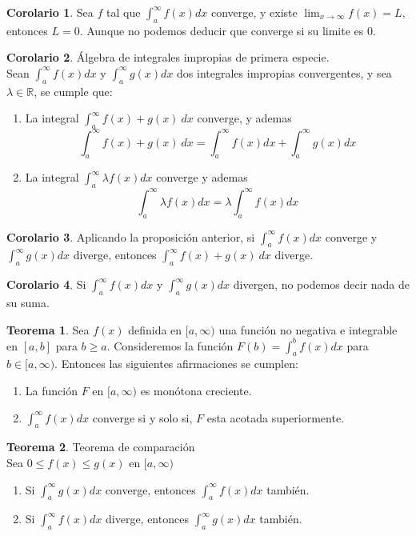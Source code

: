 \documentclass[10pt]{article}
\theoremstyle{definition}
\newtheorem{theorem}{Teorema}[section]
\newtheorem{corollary}{Corolario}[theorem]
\begin{document}
\begin{corollary}
    Sea $f$ tal que $\int_{a}^{\infty} f(x) dx$ converge, y existe $\lim_{x \to \infty} f(x)=L$, entonces $L=0$. Aunque no podemos deducir que converge si su limite es $0$.
\end{corollary}
\begin{corollary}{Álgebra de integrales impropias de primera especie.}
	\\Sean $\int_{a}^{\infty} f(x) dx$ y $\int_{a}^{\infty} g(x) dx$ dos integrales impropias convergentes, y sea $\lambda\in\mathbb{R}$, se cumple que:
	\begin{enumerate}
		\item La integral $\int_{a}^{\infty} f(x)+ g(x)\ dx$ converge, y ademas $$\int_{a}^{\infty} f(x)+g(x)\ dx=\int_{a}^{\infty} f(x) dx+\int_{a}^{\infty} g(x) dx$$
		\item La integral $\int_{a}^{\infty} \lambda f(x) dx$ converge y ademas $$\int_{a}^{\infty} \lambda f(x) dx=\lambda \int_{a}^{\infty} f(x) dx$$
	\end{enumerate}
\end{corollary}
\begin{corollary}
	Aplicando la proposición anterior, si $\int_{a}^{\infty} f(x) dx$ converge y $\int_{a}^{\infty} g(x) dx$ diverge, entonces $\int_{a}^{\infty} f(x)+g(x)\ dx$ diverge.
\end{corollary}
\begin{corollary}
	Si $\int_{a}^{\infty} f(x) dx$ y $\int_{a}^{\infty} g(x) dx$ divergen, no podemos decir nada de su suma.
\end{corollary}
\begin{theorem}
	Sea $f(x)$ definida en $[a,\infty)$ una función no negativa e integrable en $[a,b]$ para $b\ge a$. Consideremos la función $F(b)=\int_{a}^{b} f(x) dx$ para $b\in [a,\infty)$. Entonces las siguientes afirmaciones se cumplen:
	\begin{enumerate}
		\item La función $F$ en $[a,\infty)$ es monótona creciente.
		\item $\int_{a}^{\infty} f(x) dx$ converge si y solo si, $F$ esta acotada superiormente.
	\end{enumerate}
\end{theorem}
\newpage\begin{theorem}{Teorema de comparación}
	\\Sea $0\le f(x)\le g(x)$ en $[a,\infty)$
	\begin{enumerate}
		\item Si $\int_{a}^{\infty} g(x) dx$ converge, entonces $\int_{a}^{\infty} f(x) dx$ también.
		\item Si $\int_{a}^{\infty} f(x) dx$ diverge, entonces $\int_{a}^{\infty} g(x) dx$ también.
	\end{enumerate}
\end{theorem}
\end{document}
